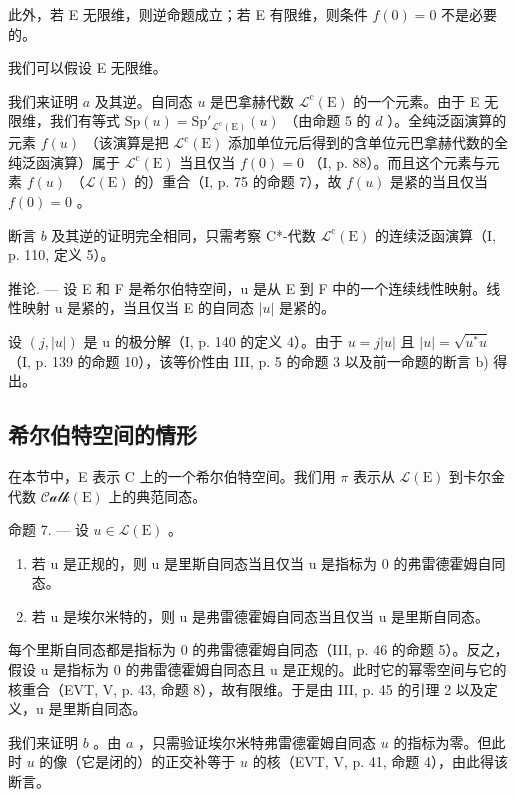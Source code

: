 此外，若 E 无限维，则逆命题成立；若 E 有限维，则条件 \(f(0) = 0\) 不是必要的。

我们可以假设 E 无限维。

我们来证明 \(a\) 及其逆。自同态 \(u\) 是巴拿赫代数 \(\mathcal{L}^{\mathrm{c}}(\mathrm{E})\) 的一个元素。由于 E 无限维，我们有等式 \(\mathrm{Sp}(u) = \mathrm{Sp}'_{\mathcal{L}^{\mathrm{c}}(\mathrm{E})}(u)\) （由命题 5 的 \(d\) ）。全纯泛函演算的元素 \(f(u)\) （该演算是把 \(\mathcal{L}^{\mathrm{c}}(\mathrm{E})\) 添加单位元后得到的含单位元巴拿赫代数的全纯泛函演算）属于 \(\mathcal{L}^{\mathrm{c}}(\mathrm{E})\) 当且仅当 \(f(0) = 0\) （I, p. 88）。而且这个元素与元素 \(f(u)\) （\(\mathcal{L}(\mathrm{E})\) 的）重合（I, p. 75 的命题 7），故 \(f(u)\) 是紧的当且仅当 \(f(0) = 0\) 。

断言 \(b\) 及其逆的证明完全相同，只需考察 C*-代数 \(\mathcal{L}^{\mathrm{c}}(\mathrm{E})\) 的连续泛函演算（I, p. 110, 定义 5）。

推论. --- 设 E 和 F 是希尔伯特空间，u 是从 E 到 F 中的一个连续线性映射。线性映射 u 是紧的，当且仅当 E 的自同态 \(|u|\) 是紧的。

设 \((j, |u|)\) 是 u 的极分解（I, p. 140 的定义 4）。由于 \(u = j|u|\) 且 \(|u| = \sqrt{u^{*}u}\) （I, p. 139 的命题 10），该等价性由 III, p. 5 的命题 3 以及前一命题的断言 b) 得出。

\subsection{希尔伯特空间的情形}

在本节中，E 表示 C 上的一个希尔伯特空间。我们用 \(\pi\) 表示从 \(\mathcal{L}(\mathrm{E})\) 到卡尔金代数 \(\mathcal{Calk}(\mathrm{E})\) 上的典范同态。

命题 7. --- 设 \(u \in \mathcal{L}(\mathrm{E})\) 。

\begin{enumerate}
\def\labelenumi{\alph{enumi})}
\item
  若 u 是正规的，则 u 是里斯自同态当且仅当 u 是指标为 0 的弗雷德霍姆自同态。
\item
  若 u 是埃尔米特的，则 u 是弗雷德霍姆自同态当且仅当 u 是里斯自同态。
\end{enumerate}

每个里斯自同态都是指标为 0 的弗雷德霍姆自同态（III, p. 46 的命题 5）。反之，假设 u 是指标为 0 的弗雷德霍姆自同态且 u 是正规的。此时它的幂零空间与它的核重合（EVT, V, p. 43, 命题 8），故有限维。于是由 III, p. 45 的引理 2 以及定义，u 是里斯自同态。

我们来证明 \(b\) 。由 \(a\) ，只需验证埃尔米特弗雷德霍姆自同态 \(u\) 的指标为零。但此时 \(u\) 的像（它是闭的）的正交补等于 \(u\) 的核（EVT, V, p. 41, 命题 4），由此得该断言。

